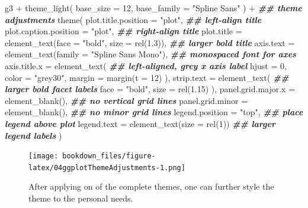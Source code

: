 \documentclass[
]{krantz}
\makeatletter
\newenvironment{Shaded}{\begin{snugshade}}{\end{snugshade}}
\newcommand{\AttributeTok}[1]{\textcolor[rgb]{0.61,0.61,0.61}{#1}}
\newcommand{\DecValTok}[1]{\textcolor[rgb]{0.06,0.06,0.06}{#1}}
\newcommand{\DocumentationTok}[1]{\textcolor[rgb]{0.37,0.37,0.37}{\textbf{\textit{#1}}}}
\newcommand{\FloatTok}[1]{\textcolor[rgb]{0.06,0.06,0.06}{#1}}
\newcommand{\FunctionTok}[1]{\textcolor[rgb]{0,0,0}{#1}}
\newcommand{\NormalTok}[1]{#1}
\newcommand{\SpecialCharTok}[1]{\textcolor[rgb]{0,0,0}{#1}}
\newcommand{\StringTok}[1]{\textcolor[rgb]{0.5,0.5,0.5}{#1}}
\newenvironment{kframe}{%
\medskip{}
\setlength{\fboxsep}{.8em}
 \def\at@end@of@kframe{}%
 \ifinner\ifhmode%
  \def\at@end@of@kframe{\end{minipage}}%
  \begin{minipage}{\columnwidth}%
 \fi\fi%
 \def\FrameCommand##1{\hskip\@totalleftmargin \hskip-\fboxsep
 \colorbox{shadecolor}{##1}\hskip-\fboxsep
     \hskip-\linewidth \hskip-\@totalleftmargin \hskip\columnwidth}%
 \MakeFramed {\advance\hsize-\width
   \@totalleftmargin\z@ \linewidth\hsize
   \@setminipage}}%
 {\par\unskip\endMakeFramed%
 \at@end@of@kframe}
\renewenvironment{Shaded}{\begin{kframe}}{\end{kframe}}
\makeatother
\begin{document}
\begin{Shaded}
\begin{Highlighting}[]
\NormalTok{g3 }\SpecialCharTok{+}
  \FunctionTok{theme\_light}\NormalTok{(}
    \AttributeTok{base\_size =} \DecValTok{12}\NormalTok{, }\AttributeTok{base\_family =} \StringTok{"Spline Sans"}
\NormalTok{  ) }\SpecialCharTok{+}
  \DocumentationTok{\#\# theme adjustments}
  \FunctionTok{theme}\NormalTok{(}
    \AttributeTok{plot.title.position =} \StringTok{"plot"}\NormalTok{, }\DocumentationTok{\#\# left{-}align title}
    \AttributeTok{plot.caption.position =} \StringTok{"plot"}\NormalTok{, }\DocumentationTok{\#\# right{-}align title}
    \AttributeTok{plot.title =} \FunctionTok{element\_text}\NormalTok{(}\AttributeTok{face =} \StringTok{"bold"}\NormalTok{, }\AttributeTok{size =} \FunctionTok{rel}\NormalTok{(}\FloatTok{1.3}\NormalTok{)), }\DocumentationTok{\#\# larger bold title}
    \AttributeTok{axis.text =} \FunctionTok{element\_text}\NormalTok{(}\AttributeTok{family =} \StringTok{"Spline Sans Mono"}\NormalTok{), }\DocumentationTok{\#\# monospaced font for axes}
    \AttributeTok{axis.title.x =} \FunctionTok{element\_text}\NormalTok{( }\DocumentationTok{\#\# left{-}aligned, grey x axis label}
      \AttributeTok{hjust =} \DecValTok{0}\NormalTok{, }\AttributeTok{color =} \StringTok{"grey30"}\NormalTok{, }\AttributeTok{margin =} \FunctionTok{margin}\NormalTok{(}\AttributeTok{t =} \DecValTok{12}\NormalTok{)}
\NormalTok{    ),}
    \AttributeTok{strip.text =} \FunctionTok{element\_text}\NormalTok{( }\DocumentationTok{\#\# larger bold facet labels}
      \AttributeTok{face =} \StringTok{"bold"}\NormalTok{, }\AttributeTok{size =} \FunctionTok{rel}\NormalTok{(}\FloatTok{1.15}\NormalTok{)}
\NormalTok{    ),}
    \AttributeTok{panel.grid.major.x =} \FunctionTok{element\_blank}\NormalTok{(), }\DocumentationTok{\#\# no vertical grid lines}
    \AttributeTok{panel.grid.minor =} \FunctionTok{element\_blank}\NormalTok{(), }\DocumentationTok{\#\# no minor grid lines}
    \AttributeTok{legend.position =} \StringTok{"top"}\NormalTok{, }\DocumentationTok{\#\# place legend above plot}
    \AttributeTok{legend.text =} \FunctionTok{element\_text}\NormalTok{(}\AttributeTok{size =} \FunctionTok{rel}\NormalTok{(}\DecValTok{1}\NormalTok{)) }\DocumentationTok{\#\# larger legend labels}
\NormalTok{  )}
\end{Highlighting}
\end{Shaded}

\begin{figure}
\centering
\texttt{[image: bookdown\_files/figure-latex/04ggplotThemeAdjustments-1.png]}
\caption{\label{fig:04ggplotThemeAdjustments}After applying on of the complete themes, one can further style the theme to the personal needs.}
\end{figure}
\end{document}
